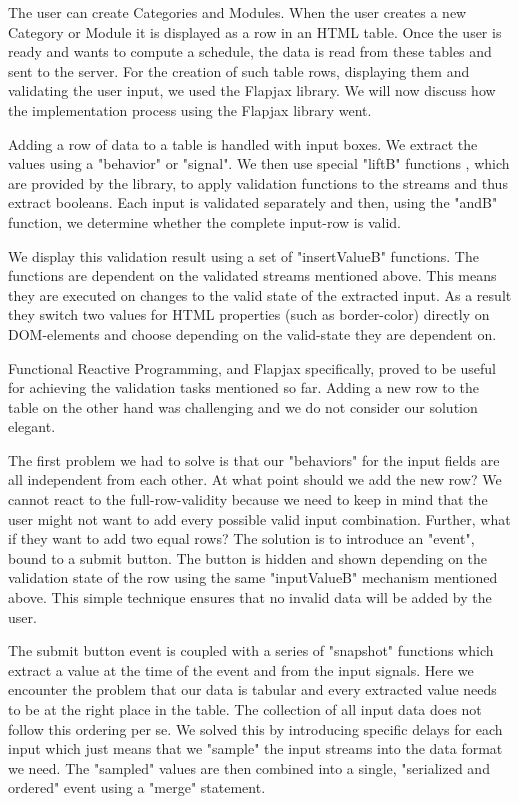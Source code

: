 \label{sec:impl-ui-alon}
The user can create Categories and Modules.
When the user creates a new Category or Module it is displayed
as a row in an HTML table.
Once the user is ready and wants to compute a schedule,
the data is read from these tables and sent to the server.
For the creation of such table rows, displaying them and validating 
the user input, we used the Flapjax library.
We will now discuss how the implementation process using 
the Flapjax library went.

Adding a row of data to a table is handled with input boxes. We extract the
values using a "behavior" or "signal". We then use special "liftB" functions
, which are provided by the library, to apply validation functions to the
streams and thus extract booleans. Each input is validated separately and then,
using the "andB" function, we determine whether the complete input-row is valid.

We display this validation result using a set of "insertValueB" functions.
The functions are dependent on the validated streams mentioned above. This
means they are executed on changes to the valid state of the extracted input.
As a result they switch two values for HTML properties (such as border-color)
directly on DOM-elements and choose depending on the valid-state they are
dependent on.

Functional Reactive Programming, and Flapjax specifically, proved to be useful
for achieving the validation tasks mentioned so far. 
Adding a new row to the table on the
other hand was challenging and we do not consider our solution elegant.

The first problem we had to solve is that our "behaviors" for the input fields
are all independent from each other. At what point should we add the new row?
We cannot react to the full-row-validity because we need to keep in mind that
the user might not want to add every possible valid input combination. Further,
what if they want to add two equal rows? The solution is to introduce an "event",
bound to a submit button. The button is hidden and shown depending on the
validation state of the row using the same "inputValueB" mechanism mentioned
above. This simple technique ensures that no invalid data will be added by
the user.

The submit button event is coupled with a series of "snapshot" functions which
extract a value at the time of the event and from the input signals. Here we
encounter the problem that our data is tabular and every extracted value needs
to be at the right place in the table. The collection of all input data does not
follow this ordering per se. We solved this by introducing specific delays for
each input which just means that we "sample" the input streams into the data
format we need. The "sampled" values are then combined into a single, "serialized
and ordered" event using a "merge" statement.

